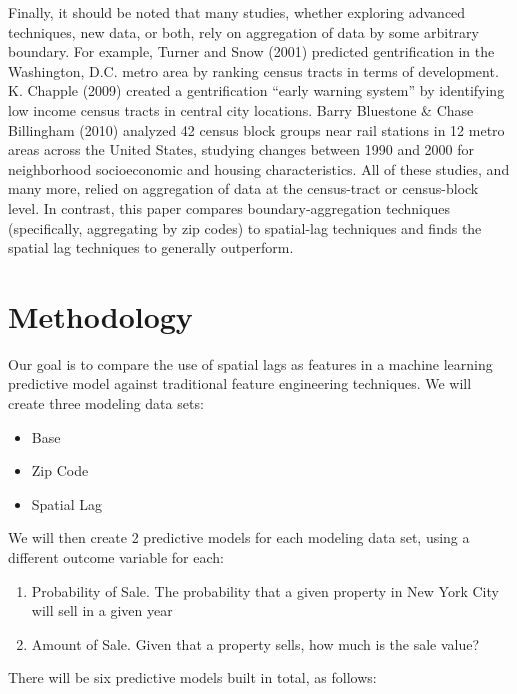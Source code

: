 \documentclass[]{article}
\providecommand{\tightlist}{%
  \setlength{\itemsep}{0pt}\setlength{\parskip}{0pt}}
\begin{document}
Finally, it should be noted that many studies, whether exploring
advanced techniques, new data, or both, rely on aggregation of data by
some arbitrary boundary. For example, Turner and Snow (2001) predicted
gentrification in the Washington, D.C. metro area by ranking census
tracts in terms of development. K. Chapple (2009) created a
gentrification ``early warning system'' by identifying low income census
tracts in central city locations. Barry Bluestone \& Chase Billingham
(2010) analyzed 42 census block groups near rail stations in 12 metro
areas across the United States, studying changes between 1990 and 2000
for neighborhood socioeconomic and housing characteristics. All of these
studies, and many more, relied on aggregation of data at the
census-tract or census-block level. In contrast, this paper compares
boundary-aggregation techniques (specifically, aggregating by zip codes)
to spatial-lag techniques and finds the spatial lag techniques to
generally outperform.

\section{Methodology}\label{methodology}

Our goal is to compare the use of spatial lags as features in a machine
learning predictive model against traditional feature engineering
techniques. We will create three modeling data sets:

\begin{itemize}
\tightlist
\item
  Base
\item
  Zip Code
\item
  Spatial Lag
\end{itemize}

We will then create 2 predictive models for each modeling data set,
using a different outcome variable for each:

\begin{enumerate}
\def\labelenumi{\arabic{enumi})}
\tightlist
\item
  Probability of Sale. The probability that a given property in New York
  City will sell in a given year
\item
  Amount of Sale. Given that a property sells, how much is the sale
  value?
\end{enumerate}

There will be six predictive models built in total, as follows:
\end{document}
